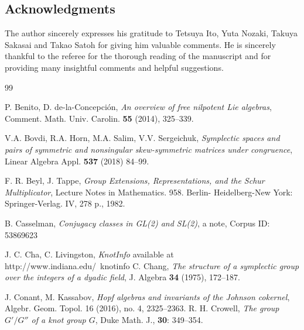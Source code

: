\documentclass{article}
\theoremstyle{plain}
\theoremstyle{definition}
\begin{document}
{\subsection*{Acknowledgments}
The author sincerely expresses his gratitude to Tetsuya Ito, Yuta Nozaki, Takuya Sakasai and Takao Satoh for giving him valuable comments. 
He is sincerely thankful to the referee for the thorough reading of the manuscript and for providing many insightful comments and helpful suggestions.
\begin{thebibliography}{99}

\normalsize
\ifx\undefined\bysame
\newcommand{\bysame}{\leavevmode\hbox to3em{\hrulefill}\,}
\fi


P. Benito, D. de-la-Concepci\'{o}n,
{\it An overview of free nilpotent Lie algebras},
Comment. Math. Univ. Carolin. {\bf 55} (2014), 325--339.


V.A. Bovdi, R.A. Horn, M.A. Salim, V.V. Sergeichuk, {\it Symplectic spaces
and pairs of symmetric and nonsingular skew-symmetric matrices under
congruence}, Linear Algebra Appl. {\bf 537} (2018) 84--99.

F. R. Beyl, J. Tappe, {\it Group Extensions, Representations, and the Schur Multiplicator},
Lecture Notes in Mathematics. 958. Berlin-
Heidelberg-New York: Springer-Verlag. IV, 278 p., 1982.


B. Casselman, {\it Conjugacy classes in GL(2) and SL(2)}, a note, Corpus ID: 53869623

 J. C. Cha, C. Livingston, {\it KnotInfo} available at http://www.indiana.edu/~knotinfo
 C. Chang, {\it The structure of a symplectic group over the integers of a dyadic field}, J. Algebra {\bf 34} (1975), 172--187.

J. Conant, M. Kassabov, {\it Hopf algebras and invariants of the Johnson cokernel},
Algebr. Geom. Topol. 16 (2016), no. 4, 2325--2363.
R. H. Crowell, {\it The group $G'/G''$ of a knot group $G$}, Duke Math. J., {\bf 30}: 349--354.




\end{thebibliography}}
\end{document}
